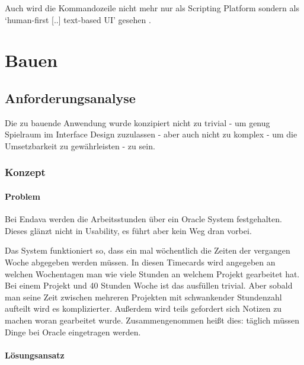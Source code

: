 \documentclass[oneside,bibliography=totocnumbered,BCOR=5mm]{scrbook}
\begin{document}
Auch wird die Kommandozeile nicht mehr nur als Scripting Platform sondern als
`human-first [..] text-based UI' gesehen \parencite{clig}.



\chapter{Bauen}
\section{Anforderungsanalyse}

Die zu bauende Anwendung wurde konzipiert nicht zu trivial - um genug
Spielraum im Interface Design zuzulassen - aber auch nicht zu komplex - um die
Umsetzbarkeit zu gewährleisten - zu sein.

\subsection{Konzept}
\subsubsection{Problem}

Bei Endava werden die Arbeitsstunden über ein Oracle System festgehalten. Dieses
glänzt nicht in Usability, es führt aber kein Weg dran vorbei.


Das System funktioniert so, dass ein mal wöchentlich die Zeiten der vergangen
Woche abgegeben werden müssen. In diesen Timecards wird angegeben an welchen
Wochentagen man wie viele Stunden an welchem Projekt gearbeitet hat. Bei einem
Projekt und 40 Stunden Woche ist das ausfüllen trivial. Aber sobald man seine
Zeit zwischen mehreren Projekten mit schwankender Stundenzahl aufteilt wird
es komplizierter. Außerdem wird teils gefordert sich Notizen zu machen woran
gearbeitet wurde. Zusammengenommen heißt dies: täglich müssen Dinge bei Oracle
eingetragen werden.


\subsubsection{Lösungsansatz}
\end{document}
